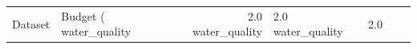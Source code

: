 \begin{tabular}{llrlrrr}
\toprule
Dataset & Budget (%
\midrule
water_quality & 2.0%
water_quality & 2.0%
water_quality & 2.0%
\bottomrule
\end{tabular}
